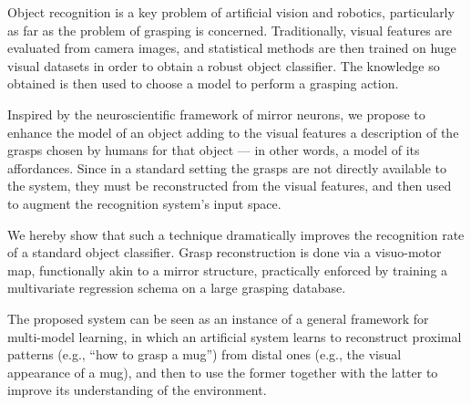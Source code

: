 Object recognition is a key problem of artificial vision and robotics,
particularly as far as the problem of grasping is concerned. Traditionally,
visual features are evaluated from camera images, and statistical methods
are then trained on huge visual datasets in order to obtain a robust object
classifier. The knowledge so obtained is then used to choose a model to
perform a grasping action.

Inspired by the neuroscientific framework of mirror neurons, we propose
to enhance the model of an object adding to the visual features a description
of the grasps chosen by humans for that object --- in other words, a model of
its affordances. Since in a standard setting the grasps are not directly
available to the system, they must be reconstructed from the visual features,
and then used to augment the recognition system's input space.

We hereby show that such a technique dramatically improves the recognition
rate of a standard object classifier. Grasp reconstruction is done via
a visuo-motor map, functionally akin to a mirror structure, practically
enforced by training a multivariate regression schema on a large grasping
database.

The proposed system can be seen as an instance of a general framework for
multi-model learning, in which an artificial system learns to reconstruct
proximal patterns (e.g., ``how to grasp a mug'') from distal ones (e.g., the
visual appearance of a mug), and then to use the former together with the
latter to improve its understanding of the environment.
